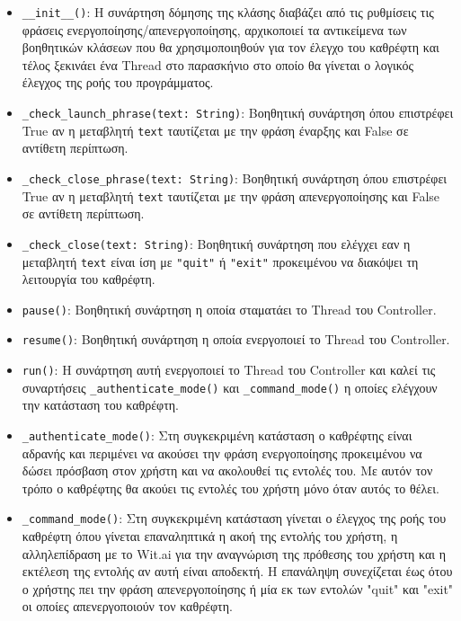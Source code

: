 \begin{itemize}
    \item \texttt{\_\_init\_\_()}: Η συνάρτηση δόμησης της κλάσης διαβάζει από τις ρυθμίσεις τις φράσεις ενεργοποίησης/απενεργοποίησης, αρχικοποιεί τα αντικείμενα των βοηθητικών κλάσεων που θα χρησιμοποιηθούν για τον έλεγχο του καθρέφτη και τέλος ξεκινάει ένα Thread στο παρασκήνιο στο οποίο θα γίνεται ο λογικός έλεγχος της ροής του προγράμματος.
    \item \texttt{\_check\_launch\_phrase(text: String)}: Βοηθητική συνάρτηση όπου επιστρέφει True αν η μεταβλητή \texttt{text} ταυτίζεται με την φράση έναρξης και False σε αντίθετη περίπτωση.
    \item \texttt{\_check\_close\_phrase(text: String)}: Βοηθητική συνάρτηση όπου επιστρέφει True αν η μεταβλητή \texttt{text} ταυτίζεται με την φράση απενεργοποίησης και False σε αντίθετη περίπτωση.
    \item \texttt{\_check\_close(text: String)}: Βοηθητική συνάρτηση που ελέγχει εαν η μεταβλητή \texttt{text} είναι ίση με \texttt{"quit"} ή \texttt{"exit"} προκειμένου να διακόψει τη λειτουργία του καθρέφτη.
    \item \texttt{pause()}: Βοηθητική συνάρτηση η οποία σταματάει το Thread του Controller.
    \item \texttt{resume()}: Βοηθητική συνάρτηση η οποία ενεργοποιεί το Thread του Controller.
    \item \texttt{run()}: H συνάρτηση αυτή ενεργοποιεί το Thread του Controller και καλεί τις συναρτήσεις \texttt{\_authenticate\_mode()} και \texttt{\_command\_mode()} η οποίες ελέγχουν την κατάσταση του καθρέφτη.
    \item \texttt{\_authenticate\_mode()}: Στη συγκεκριμένη κατάσταση ο καθρέφτης είναι αδρανής και περιμένει να ακούσει την φράση ενεργοποίησης προκειμένου να δώσει πρόσβαση στον χρήστη και να ακολουθεί τις εντολές του. Με αυτόν τον τρόπο ο καθρέφτης θα ακούει τις εντολές του χρήστη μόνο όταν αυτός το θέλει.
    \item \texttt{\_command\_mode()}: Στη συγκεκριμένη κατάσταση γίνεται ο έλεγχος της ροής του καθρέφτη όπου γίνεται επαναληπτικά η ακοή της εντολής του χρήστη, η αλληλεπίδραση με το Wit.ai για την αναγνώριση της πρόθεσης του χρήστη και η εκτέλεση της εντολής αν αυτή είναι αποδεκτή. Η επανάληψη συνεχίζεται έως ότου ο χρήστης πει την φράση απενεργοποίησης ή μία εκ των εντολών "quit" και "exit" οι οποίες απενεργοποιούν τον καθρέφτη.
\end{itemize}
\newpage
